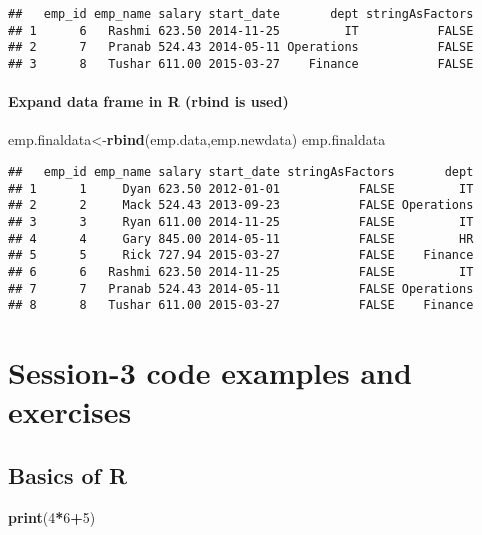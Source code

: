 \documentclass[
]{article}
\newenvironment{Shaded}{\begin{snugshade}}{\end{snugshade}}
\newcommand{\DecValTok}[1]{\textcolor[rgb]{0.00,0.00,0.81}{#1}}
\newcommand{\FunctionTok}[1]{\textcolor[rgb]{0.13,0.29,0.53}{\textbf{#1}}}
\newcommand{\NormalTok}[1]{#1}
\newcommand{\OtherTok}[1]{\textcolor[rgb]{0.56,0.35,0.01}{#1}}
\newcommand{\SpecialCharTok}[1]{\textcolor[rgb]{0.81,0.36,0.00}{\textbf{#1}}}
\begin{document}
\begin{verbatim}
##   emp_id emp_name salary start_date       dept stringAsFactors
## 1      6   Rashmi 623.50 2014-11-25         IT           FALSE
## 2      7   Pranab 524.43 2014-05-11 Operations           FALSE
## 3      8   Tushar 611.00 2015-03-27    Finance           FALSE
\end{verbatim}

\paragraph{Expand data frame in R (rbind is
used)}\label{expand-data-frame-in-r-rbind-is-used}

\begin{Shaded}
\begin{Highlighting}[]
\NormalTok{emp.finaldata}\OtherTok{\textless{}{-}}\FunctionTok{rbind}\NormalTok{(emp.data,emp.newdata)}
\NormalTok{emp.finaldata}
\end{Highlighting}
\end{Shaded}

\begin{verbatim}
##   emp_id emp_name salary start_date stringAsFactors       dept
## 1      1     Dyan 623.50 2012-01-01           FALSE         IT
## 2      2     Mack 524.43 2013-09-23           FALSE Operations
## 3      3     Ryan 611.00 2014-11-25           FALSE         IT
## 4      4     Gary 845.00 2014-05-11           FALSE         HR
## 5      5     Rick 727.94 2015-03-27           FALSE    Finance
## 6      6   Rashmi 623.50 2014-11-25           FALSE         IT
## 7      7   Pranab 524.43 2014-05-11           FALSE Operations
## 8      8   Tushar 611.00 2015-03-27           FALSE    Finance
\end{verbatim}

\section{Session-3 code examples and
exercises}\label{session-3-code-examples-and-exercises}

\subsection{Basics of R}\label{basics-of-r}

\begin{Shaded}
\begin{Highlighting}[]
\FunctionTok{print}\NormalTok{(}\DecValTok{4}\SpecialCharTok{*}\DecValTok{6}\SpecialCharTok{+}\DecValTok{5}\NormalTok{)}
\end{Highlighting}
\end{Shaded}
\end{document}
